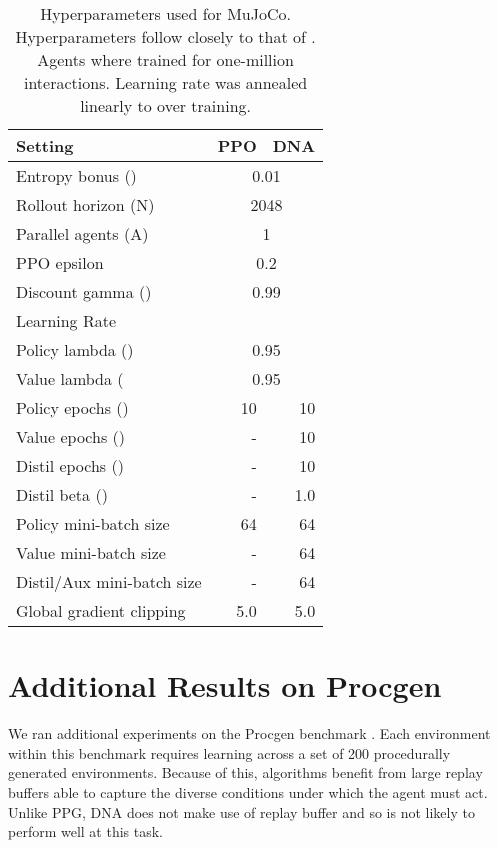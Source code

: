 \documentclass{article}
\begin{document}
\begin{table}[h]
    \centering
    \caption{Hyperparameters used for MuJoCo. Hyperparameters follow closely to that of \cite{schulman2017proximal}. Agents where trained for one-million interactions.  Learning rate was annealed linearly to  over training.}
    \begin{tabular}{l r r}
    \toprule
        Setting & PPO & DNA \\
    \midrule
Entropy bonus ()   & \multicolumn{2}{c}{0.01}\\ 
        Rollout horizon (N)             & \multicolumn{2}{c}{2048}\\ 
        Parallel agents (A)             & \multicolumn{2}{c}{1}\\ 
        PPO epsilon           & \multicolumn{2}{c}{0.2}\\ 
        Discount gamma ()       & \multicolumn{2}{c}{0.99}\\ 
Learning Rate                   & \multicolumn{2}{c}{}\\
        
        Policy lambda ()   & \multicolumn{2}{c}{0.95}\\ 
        Value lambda (     & \multicolumn{2}{c}{0.95}\\  
        \midrule
        Policy epochs () & 10 & 10 \\
        Value epochs ()            & - & 10 \\
        Distil epochs ()       & - & 10 \\
        Distil beta ()       & - & 1.0 \\
        
        Policy mini-batch size          & 64 & 64 \\ 
        Value mini-batch size           & - & 64 \\
        Distil/Aux mini-batch size      & -  & 64 \\
        Global gradient clipping        & 5.0 & 5.0 \\
    \bottomrule
    \end{tabular}
    \label{tab:mujoco_hps}
\end{table}

\clearpage

\section{Additional Results on Procgen}
\label{app:procgen}

We ran additional experiments on the Procgen benchmark \cite{cobbe2020leveraging}. Each environment within this benchmark requires learning across a set of 200 procedurally generated environments. Because of this, algorithms benefit from large replay buffers able to capture the diverse conditions under which the agent must act. Unlike PPG, DNA does not make use of replay buffer and so is not likely to perform well at this task. 
\end{document}
